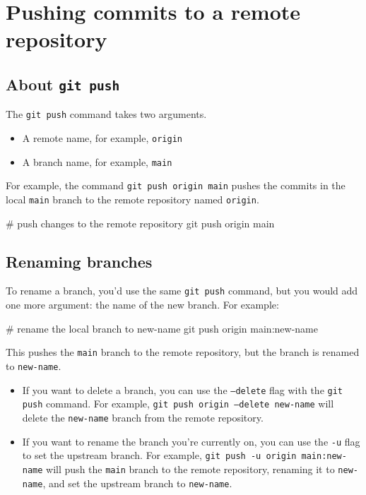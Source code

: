 \newpage
\section{Pushing commits to a remote repository}

\subsection{About \texttt{git push}}

The \texttt{git push} command takes two arguments.
\begin{itemize}
    \item A remote name, for example, \texttt{origin}
    \item A branch name, for example, \texttt{main}
\end{itemize}

For example, the command \texttt{git push origin main} pushes the commits in the local \texttt{main} branch to the remote repository named \texttt{origin}.
\begin{exampleblock}
    \begin{codeblock}[language=bash]
# push changes to the remote repository
git push origin main
    \end{codeblock}
\end{exampleblock}

\subsection{Renaming branches}

To rename a branch, you'd use the same \texttt{git push} command, but you would add one more argument: the name of the new branch. For example:
\begin{exampleblock}
    \begin{codeblock}[language=bash]
# rename the local branch to new-name
git push origin main:new-name
    \end{codeblock}
\end{exampleblock}

This pushes the \texttt{main} branch to the remote repository, but the branch is renamed to \texttt{new-name}.
\begin{tipsblock}
    \begin{itemize}
        \item If you want to delete a branch, you can use the \texttt{--delete} flag with the \texttt{git push} command. For example, \texttt{git push origin --delete new-name} will delete the \texttt{new-name} branch from the remote repository.
        \item If you want to rename the branch you're currently on, you can use the \texttt{-u} flag to set the upstream branch. For example, \texttt{git push -u origin main:new-name} will push the \texttt{main} branch to the remote repository, renaming it to \texttt{new-name}, and set the upstream branch to \texttt{new-name}.
    \end{itemize}
\end{tipsblock}

